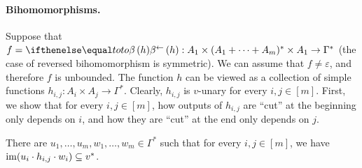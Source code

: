 \paragraph{Bihomomorphisms.} Suppose that $f = \bihom{to, h} : A_1 \times (A_1 + \dots + A_m)^* \times A_1 \to \Gamma^*$ (the case of reversed bihomomorphism is symmetric). We can assume that $f \neq \varepsilon$, and therefore $f$ is unbounded. The function $h$ can be viewed as a collection of simple functions $h_{i,j} : A_i \times A_j \to \Gamma^*$. Clearly, $h_{i,j}$ is $v$-unary for every $i,j \in [m]$. First, we show that for every $i,j \in [m]$, how outputs of $h_{i,j}$ are ``cut'' at the beginning only depends on $i$, and how they are ``cut'' at the end only depends on $j$.

\begin{claim}\label{claim:cyclicity-bihom-prefix-and-suffix-depends-only-on-bound-type}
    There are $u_1, \dots, u_m, w_1, \dots, w_m \in \Gamma^*$ such that for every $i,j \in [m]$, we have $\operatorname{\mathrm{im}}(u_i \cdot h_{i,j} \cdot w_i) \subseteq v^*$. 
\end{claim}

